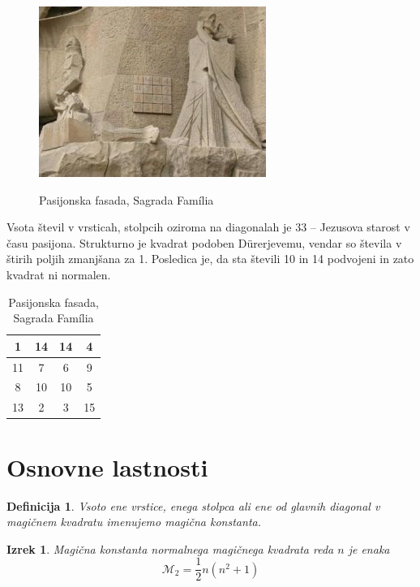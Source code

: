 \documentclass[a4paper,12pt]{article}
\newtheorem{izrek}{Izrek}
\newtheorem{definicija}{Definicija}
\newcommand{\m}{\mathcal{M}_2}
\newcommand{\pojem}[1]{\emph{\color{purple}#1}}
\newenvironment{magic}[3]
   {\begin{table}[h]
      \caption{#2}
      \label{#3}
      \large
      \centering
      \begin{tabular}{|*{#1}{c|}}
         \hline
   }
      {
      \end{tabular}
      \end{table}
      }
\begin{document}
\begin{figure}[!ht]
   \centering
   \caption{Pasijonska fasada, Sagrada Família}
   \includegraphics{sagrada.png}
   \label{fig:sagrada}
\end{figure}

Vsota števil v vrsticah, stolpcih oziroma na diagonalah je 33 -- Jezusova starost
v času pasijona. Strukturno je kvadrat podoben Dürerjevemu, vendar so števila
v štirih poljih zmanjšana za 1. Posledica je, da sta števili 10 in 14 podvojeni
in zato kvadrat ni normalen.
%
\begin{magic}{4}{Pasijonska fasada, Sagrada Família}{table:sagrada}
   1 & 14 & 14 &  4 \\\hline
   11 &  7 &  6 &  9 \\\hline
   8 & 10 & 10 &  5 \\\hline
   13 &  2 &  3 & 15 \\\hline
\end{magic}


\section{Osnovne lastnosti}

\begin{definicija}
      Vsoto ene vrstice, enega stolpca ali ene od glavnih diagonal
      v magičnem kvadratu imenujemo \pojem{magična konstanta}.
\end{definicija}

\begin{izrek}
   Magična konstanta normalnega magičnega kvadrata reda $n$
   je enaka
   \begin{equation}
      \label{eq:mc}
      \m = \frac{1}{2} n(n^2+1)
   \end{equation}
\end{izrek}
\end{document}
